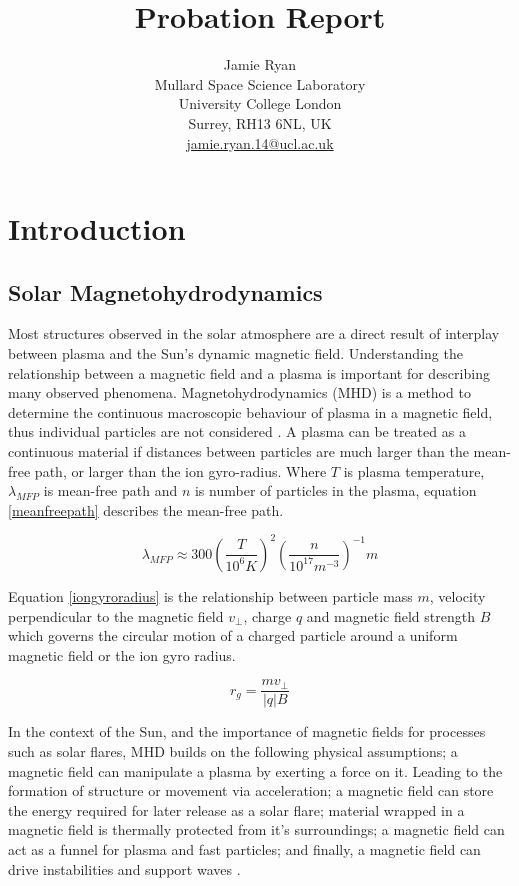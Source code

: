 \documentclass[11pt]{article}
\title{Probation Report}
\author{Jamie Ryan \\ 
Mullard Space Science Laboratory \\
University College London \\
Surrey, RH13 6NL, UK\\
\href{mailto:jamie.ryan.14@ucl.ac.uk}{jamie.ryan.14@ucl.ac.uk}
\date{}}
\begin{document}
\maketitle


\section{Introduction}


\subsection{Solar Magnetohydrodynamics}\label{MHD}
Most structures observed in the solar atmosphere are a direct result of interplay between plasma and the Sun's dynamic magnetic field. Understanding the relationship between a magnetic field and a plasma is important for describing many observed phenomena. Magnetohydrodynamics (MHD) is a method to determine the continuous macroscopic behaviour of plasma in a magnetic field, thus individual particles are not considered \citep{1982soma.book.....P}. A plasma can be treated as a continuous material if distances between particles are much larger than the mean-free path, or larger than the ion gyro-radius. Where $T$ is plasma temperature, $\lambda_{MFP}$ is mean-free path and $n$ is number of particles in the plasma, equation \ref{meanfreepath} describes the mean-free path. 

\begin{equation}\label{meanfreepath}
\lambda_{MFP}\approx300(\frac{T}{10^{6}K})^{2}(\frac{n}{10^{17}m^{-3}})^{-1}m
\end{equation}

Equation \ref{iongyroradius} is the relationship between particle mass $m$, velocity perpendicular to the magnetic field $v_{\bot}$, charge $q$ and magnetic field strength $B$  which governs the circular motion of a charged particle around a uniform magnetic field or the ion gyro radius. 

\begin{equation}\label{iongyroradius}
r_{g}=\frac{mv_{\bot}}{|q|B}
\end{equation}

In the context of the Sun, and the importance of magnetic fields for processes such as solar flares, MHD builds on the following physical assumptions; a magnetic field can manipulate a plasma by exerting a force on it. Leading to the formation of structure or movement via acceleration; a magnetic field can store the energy required for later release as a solar flare; material wrapped in a magnetic field is thermally protected from it's surroundings; a magnetic field can act as a funnel for plasma and fast particles; and finally, a magnetic field can drive instabilities and support waves \citep{2003dysu.book.....D}.
\end{document}
